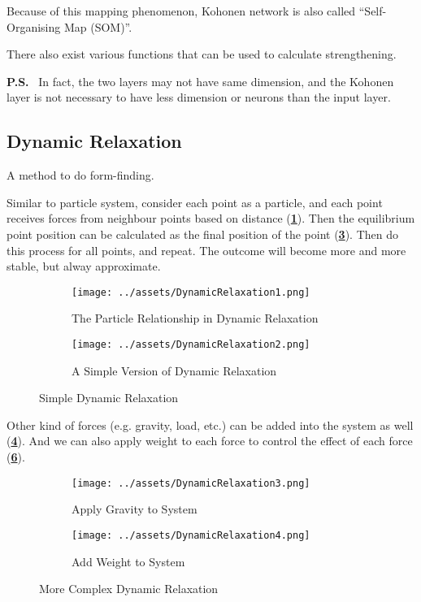 \documentclass[a4paper, openany]{book}
\begin{document}
Because of this mapping phenomenon, Kohonen network is also called ``Self-Organising Map (SOM)''.

There also exist various functions that can be used to calculate strengthening.

\textbf{P.S.} \  In fact, the two layers may not have same dimension, and the Kohonen layer is not necessary to have less dimension or neurons than the input layer.

\subsection{Dynamic Relaxation}\label{sec:DynamicRelaxation}

A method to do form-finding.

Similar to particle system, consider each point as a particle, and each point receives forces from neighbour points based on distance (\textbf{\cref{fig:DynamicRelaxation1}}). Then the equilibrium point position can be calculated as the final position of the point (\textbf{\cref{fig:DynamicRelaxation2}}). Then do this process for all points, and repeat. The outcome will become more and more stable, but alway approximate.

\begin{figure}[htbp]
  \centering
  \begin{subfigure}{0.38\textwidth}
    \centering
    \texttt{[image: ../assets/DynamicRelaxation1.png]}
    \caption{The Particle Relationship in Dynamic Relaxation}
    \label{fig:DynamicRelaxation1}
  \end{subfigure}
  \begin{subfigure}{0.38\textwidth}
    \centering
    \texttt{[image: ../assets/DynamicRelaxation2.png]}
    \caption{A Simple Version of Dynamic Relaxation}
    \label{fig:DynamicRelaxation2}
  \end{subfigure}
  \caption{Simple Dynamic Relaxation}
\end{figure}

Other kind of forces (e.g. gravity, load, etc.) can be added into the system as well (\textbf{\cref{fig:DynamicRelaxation3}}). And we can also apply weight to each force to control the effect of each force (\textbf{\cref{fig:DynamicRelaxation4}}).

\begin{figure}[htbp]
  \centering
  \begin{subfigure}{0.38\textwidth}
    \centering
    \texttt{[image: ../assets/DynamicRelaxation3.png]}
    \caption{Apply Gravity to System}
    \label{fig:DynamicRelaxation3}
  \end{subfigure}
  \begin{subfigure}{0.38\textwidth}
    \centering
    \texttt{[image: ../assets/DynamicRelaxation4.png]}
    \caption{Add Weight to System}
    \label{fig:DynamicRelaxation4}
  \end{subfigure}
  \caption{More Complex Dynamic Relaxation}
\end{figure}
\end{document}
